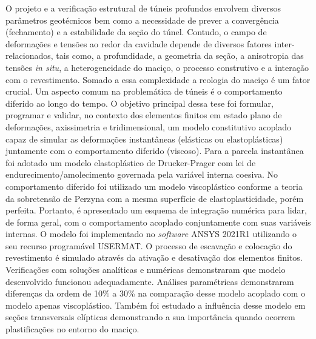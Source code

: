 O projeto e a verificação estrutural de túneis profundos envolvem diversos parâmetros geotécnicos bem como a necessidade de prever a convergência (fechamento) e a estabilidade da seção do túnel. Contudo, o campo de deformações e tensões ao redor da cavidade depende de diversos fatores inter-relacionados, tais como, a profundidade, a geometria da seção, a anisotropia das tensões \textit{in situ}, a heterogeneidade do maciço, o processo construtivo e a interação com o revestimento. Somado a essa complexidade a reologia do maciço é um fator crucial. Um aspecto comum na problemática de túneis é o comportamento diferido ao longo do tempo. O objetivo principal dessa tese foi formular, programar e validar, no contexto dos elementos finitos em estado plano de deformações, axissimetria e tridimensional, um modelo constitutivo acoplado capaz de simular as deformações instantâneas (elásticas ou elastoplásticas) juntamente com o comportamento diferido (viscoso). Para a parcela instantânea foi adotado um modelo elastoplástico de Drucker-Prager com lei de endurecimento/amolecimento governada pela variável interna coesiva. No comportamento diferido foi utilizado um modelo viscoplástico conforme a teoria da sobretensão de Perzyna com a mesma superfície de elastoplasticidade, porém perfeita. Portanto, é apresentado um esquema de integração numérica para lidar, de forma geral, com o comportamento acoplado conjuntamente com suas variáveis internas. O modelo foi implementado no \textit{software} ANSYS 2021R1 utilizando o seu recurso programável USERMAT. O processo de escavação e colocação do revestimento é simulado através da ativação e desativação dos elementos finitos. Verificações com soluções analíticas e numéricas demonstraram que modelo desenvolvido funcionou adequadamente. Análises paramétricas demonstraram diferenças da ordem de 10\% a 30\% na comparação desse modelo acoplado com o modelo apenas viscoplástico. Também foi estudado a influência desse modelo em seções transversais elípticas demonstrando a sua importância quando ocorrem plastificações no entorno do maciço.